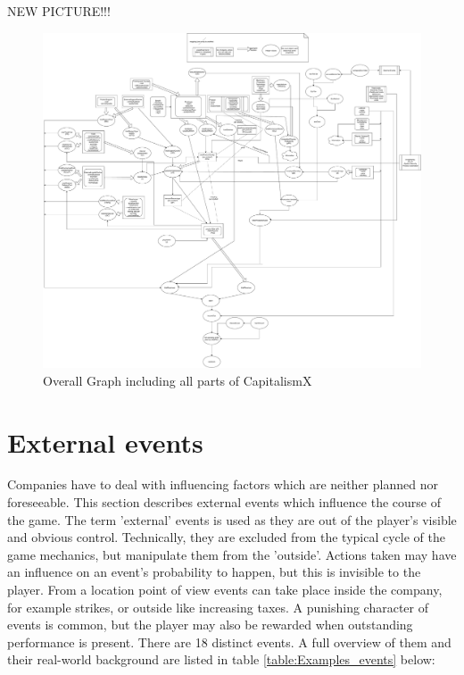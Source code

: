 \documentclass[11pt,titlepage,oneside,openany]{book}
\begin{document}
NEW PICTURE!!!
\begin{landscape}
\begin{figure}
    \centering
    \includegraphics[scale = 0.26]{images/Tree-like-thing.pdf}
    \caption{Overall Graph including all parts of CapitalismX}
    \label{fig:OverallGraph}
\end{figure}
\end{landscape}

\section{External events}
\label{sec:ectEvent}
Companies have to deal with influencing factors which are neither planned nor foreseeable\cite{Campbell}. This section describes external events which influence the course of the game. The term 'external' events is used as they are out of the player's visible and obvious control. Technically, they are excluded from the typical cycle of the game mechanics, but manipulate them from the 'outside'. Actions taken may have an influence on an event's probability to happen, but this is invisible to the player. From a location point of view events can take place inside the company, for example strikes, or outside like increasing taxes. A punishing character of events is common, but the player may also be rewarded when outstanding performance is present. There are 18 distinct events. A full overview of them and their real-world background are listed in table \ref{table:Examples_events} below: \\ 
\end{document}
